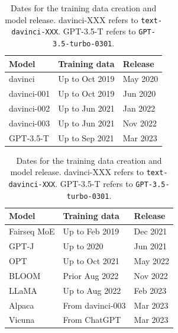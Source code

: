 \documentclass[letterpaper]{article} %
\begin{document}
\begin{table}[t!]
\centering
\begin{subtable}{\columnwidth}
\centering
\begin{tabular}{lll}
\toprule
Model            & Training data & Release   \\
\midrule
davinci          & Up to Oct 2019 & May 2020       \\
davinci-001 & Up to Oct 2019 & Jun 2020       \\
davinci-002 & Up to Jun 2021 & Jan 2022      \\
davinci-003 & Up to Jun 2021 & Nov 2022        \\
GPT-3.5-T    & Up to Sep 2021  & Mar 2023    \\
\bottomrule
\end{tabular}
\caption{GPT-3 Series LLMs}
\end{subtable}

\hspace{0.1cm}

\begin{subtable}{\columnwidth}
\centering
\begin{tabular}{lll}
\toprule
Model            & Training data & Release   \\
\midrule
Fairseq MoE      & Up to Feb 2019 &  Dec 2021     \\
GPT-J            & Up to 2020 & Jun 2021           \\
OPT              & Up to Oct 2021 &  May 2022     \\
BLOOM            & Prior Aug 2022 &  Nov 2022     \\
LLaMA            & Up to Aug 2022  & Feb 2023    \\
Alpaca           & From davinci-003 & Mar 2023 \\
Vicuna           & From ChatGPT  & Mar 2023   \\
\bottomrule
\end{tabular}
\caption{Open LLMs}
\end{subtable}
\caption{Dates for the training data creation and model release. davinci-XXX refers to \texttt{text-davinci-XXX}. GPT-3.5-T refers to \texttt{GPT-3.5-turbo-0301}.}
\label{tab:data-time}
\end{table}
\end{document}
